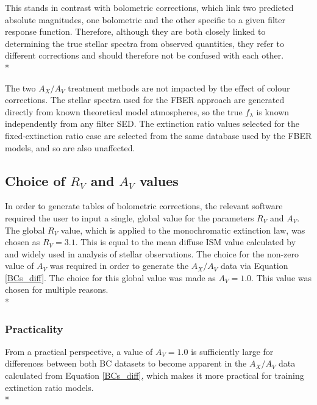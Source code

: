 \documentclass[12pt, a4paper]{report}
\begin{document}
This stands in contrast with bolometric corrections, which link two predicted absolute magnitudes, one bolometric and the other specific to a given filter response function. Therefore, although they are both closely linked to determining the true stellar spectra from observed quantities, they refer to different corrections and should therefore not be confused with each other.\\*

The two $A_{X}/A_{V}$ treatment methods are not impacted by the effect of colour corrections. The stellar spectra used for the FBER approach are generated directly from known theoretical model atmospheres, so the true $f_{\lambda}$ is known independently from any filter SED. The extinction ratio values selected for the fixed-extinction ratio case are selected from the same database used by the FBER models, and so are also unaffected.

\subsection{Choice of $R_{V}$ and $A_{V}$ values} \label{forbes}
In order to generate tables of bolometric corrections, the relevant software required the user to input a single, global value for the parameters $R_{V}$ and $A_{V}$. The global $R_{V}$ value, which is applied to the \cite{1989ApJ...345..245C} monochromatic extinction law, was chosen as $R_{V} = 3.1$. This is equal to the mean diffuse ISM value calculated by \cite{1985ApJ...288..618R} and widely used in analysis of stellar observations. The choice for the non-zero value of $A_{V}$ was required in order to generate the $A_{X}/A_{V}$ data via Equation \ref{BCs_diff}. The choice for this global value was made as $A_{V} = 1.0$. This value was chosen for multiple reasons.\\*

\subsubsection{Practicality}
From a practical perspective, a value of $A_{V} = 1.0$ is sufficiently large for differences between both BC datasets to become apparent in the $A_{X}/A_{V}$ data calculated from Equation \ref{BCs_diff}, which makes it more practical for training extinction ratio models.\\*
\end{document}
